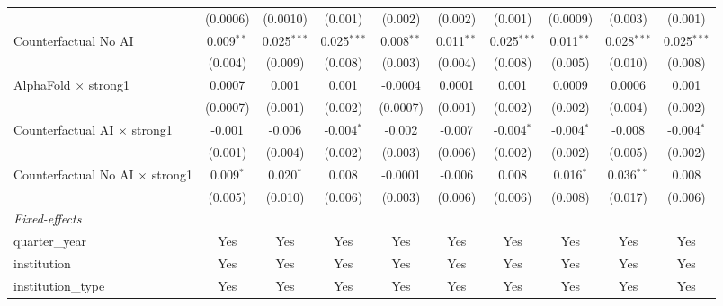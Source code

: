 \begin{tabular}{lccccccccc}
                                          & (0.0006)     & (0.0010)      & (0.001)       & (0.002)      & (0.002)      & (0.001)       & (0.0009)      & (0.003)       & (0.001)\\   
   Counterfactual No AI                   & 0.009$^{**}$ & 0.025$^{***}$ & 0.025$^{***}$ & 0.008$^{**}$ & 0.011$^{**}$ & 0.025$^{***}$ & 0.011$^{**}$  & 0.028$^{***}$ & 0.025$^{***}$\\   
                                          & (0.004)      & (0.009)       & (0.008)       & (0.003)      & (0.004)      & (0.008)       & (0.005)       & (0.010)       & (0.008)\\   
   AlphaFold $\times$ strong1             & 0.0007       & 0.001         & 0.001         & -0.0004      & 0.0001       & 0.001         & 0.0009        & 0.0006        & 0.001\\   
                                          & (0.0007)     & (0.001)       & (0.002)       & (0.0007)     & (0.001)      & (0.002)       & (0.002)       & (0.004)       & (0.002)\\   
   Counterfactual AI $\times$ strong1     & -0.001       & -0.006        & -0.004$^{*}$  & -0.002       & -0.007       & -0.004$^{*}$  & -0.004$^{*}$  & -0.008        & -0.004$^{*}$\\   
                                          & (0.001)      & (0.004)       & (0.002)       & (0.003)      & (0.006)      & (0.002)       & (0.002)       & (0.005)       & (0.002)\\   
   Counterfactual No AI $\times$ strong1  & 0.009$^{*}$  & 0.020$^{*}$   & 0.008         & -0.0001      & -0.006       & 0.008         & 0.016$^{*}$   & 0.036$^{**}$  & 0.008\\   
                                          & (0.005)      & (0.010)       & (0.006)       & (0.003)      & (0.006)      & (0.006)       & (0.008)       & (0.017)       & (0.006)\\   
   \midrule
   \emph{Fixed-effects}\\
   quarter\_year                          & Yes          & Yes           & Yes           & Yes          & Yes          & Yes           & Yes           & Yes           & Yes\\  
   institution                            & Yes          & Yes           & Yes           & Yes          & Yes          & Yes           & Yes           & Yes           & Yes\\  
   institution\_type                      & Yes          & Yes           & Yes           & Yes          & Yes          & Yes           & Yes           & Yes           & Yes\\  

\end{tabular}
